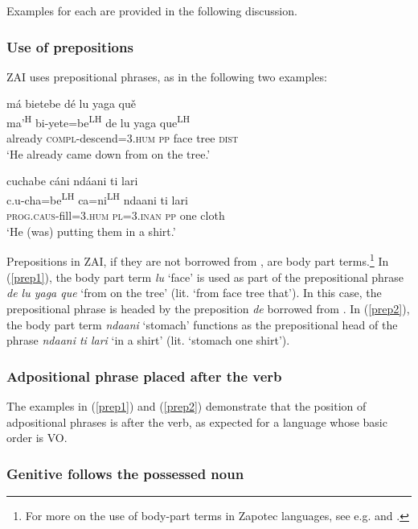 Examples for each are provided in the following discussion.


\subsubsection{Use of prepositions}

ZAI uses prepositional phrases, as in the following two examples:

\ea\label{prep1}
\glll m\'{a} bietebe d\'{e} lu yaga qu\v{e} \\
ma'\textsuperscript{H} bi-yete=be\textsuperscript{LH} de lu yaga que\textsuperscript{LH} \\
already \textsc{compl}-descend=\textsc{3.hum} \textsc{pp} face tree \textsc{dist} \\
\glt `He already came down from on the tree.' 
\z

\ea\label{prep2}
\glll cuchabe c\'{a}ni nd\'{a}ani ti lari \\
c.u-cha=be\textsuperscript{LH} ca=ni\textsuperscript{LH} ndaani ti lari \\
\textsc{prog.caus}-fill=\textsc{3.hum} \textsc{pl=3.inan} \textsc{pp} one cloth \\
\glt `He (was) putting them in a shirt.'		
\z

Prepositions in ZAI, if they are not borrowed from , are body part terms.\footnote{For more on the use of body-part terms in Zapotec languages, see e.g. \citet{maclaury1989} and \citet{perez2011b}.} In (\ref{prep1}), the body part term \textit{lu} `face' is used as part of the prepositional phrase \textit{de lu yaga que} `from on the tree' (lit. `from face tree that'). In this case, the prepositional phrase is headed by the preposition \textit{de} borrowed from . In (\ref{prep2}), the body part term \textit{ndaani} `stomach' functions as the prepositional head of the phrase \textit{ndaani ti lari} `in a shirt' (lit. `stomach one shirt').


\subsubsection{Adpositional phrase placed after the verb}

The examples in (\ref{prep1}) and (\ref{prep2}) demonstrate that the position of adpositional phrases is after the verb, as expected for a language whose basic order is VO.



\subsubsection{Genitive follows the possessed noun}

